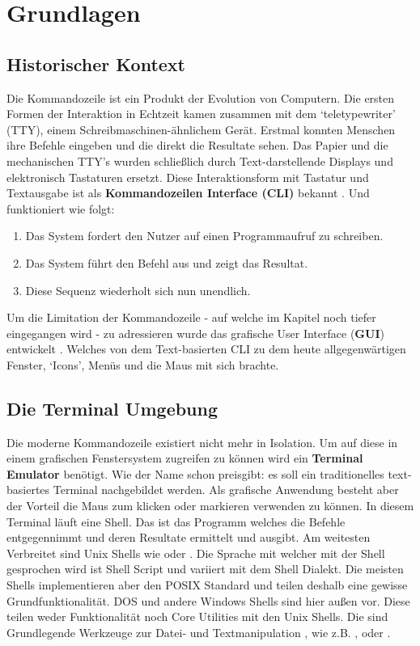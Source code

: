 \documentclass[oneside,bibliography=totocnumbered,BCOR=5mm]{scrbook}
\begin{document}
\chapter{Grundlagen}

\section{Historischer Kontext}

Die Kommandozeile ist ein Produkt der Evolution von Computern. Die ersten Formen
der Interaktion in Echtzeit kamen zusammen mit dem `teletypewriter' (TTY),
einem Schreibmaschinen-ähnlichem Gerät. Erstmal konnten Menschen ihre Befehle
eingeben und die direkt die Resultate sehen. Das Papier und die mechanischen
TTY's wurden schließlich durch Text-darstellende Displays und elektronisch
Tastaturen ersetzt. Diese Interaktionsform mit Tastatur und Textausgabe ist als
\textbf{Kommandozeilen Interface (CLI)} bekannt \parencite[35f]{nagarajan2018}.
Und funktioniert wie folgt:

\begin{enumerate}
  \item Das System fordert den Nutzer auf einen Programmaufruf zu schreiben.
  \item Das System führt den Befehl aus und zeigt das Resultat.
  \item Diese Sequenz wiederholt sich nun unendlich.
\end{enumerate}

Um die Limitation der Kommandozeile  - auf welche im Kapitel %
noch tiefer eingegangen wird - zu adressieren wurde das grafische User
Interface (\textbf{GUI}) entwickelt \parencite{nielson1993}. Welches von dem
Text-basierten CLI zu dem heute allgegenwärtigen Fenster, `Icons', Menüs und die
Maus mit sich brachte.

\section{Die Terminal Umgebung}

Die moderne Kommandozeile existiert nicht mehr in Isolation. Um auf diese in
einem grafischen Fenstersystem zugreifen zu können wird ein \textbf{Terminal
Emulator} benötigt. Wie der Name schon preisgibt: es soll ein traditionelles
text-basiertes Terminal nachgebildet werden. Als grafische Anwendung besteht
aber der Vorteil die Maus zum klicken oder markieren verwenden zu können. In
diesem Terminal läuft eine Shell. Das ist das Programm welches die Befehle
entgegennimmt und deren Resultate ermittelt und ausgibt. Am weitesten Verbreitet
sind Unix Shells wie  oder . Die Sprache mit
welcher mit der Shell gesprochen wird ist Shell Script und variiert mit dem
Shell Dialekt. Die meisten Shells implementieren aber den POSIX Standard und
teilen deshalb eine gewisse Grundfunktionalität. DOS und andere Windows Shells
sind hier außen vor. Diese teilen weder Funktionalität noch Core Utilities mit
den Unix Shells. Die  sind Grundlegende Werkzeuge zur
Datei- und Textmanipulation \parencite{coreutils}, wie z.B. ,
 oder .
\end{document}
